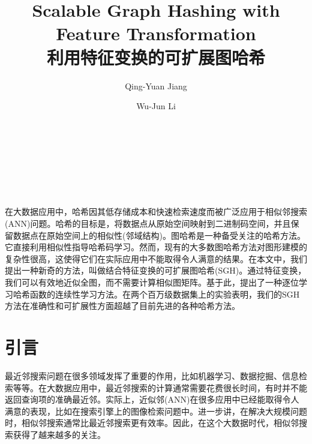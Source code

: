 \message{ !name(SGH.tex)}\documentclass[prodmode,acmtecs]{acmsmall}
\begin{document}


  
\title{Scalable Graph Hashing with Feature Transformation \\ 
	利用特征变换的可扩展图哈希} 

\author{Qing-Yuan Jiang}
\author{Wu-Jun Li}

\address{National Key Laboratory for Novel Software Technology }\\
\address{Collaborative Innovation Center of Novel Software Technology and Industrialization}\\
\address{Department of Computer Science and Technology, Nanjing University, China }\\


\maketitle


\begin{摘要}
  
在大数据应用中，哈希因其低存储成本和快速检索速度而被广泛应用于相似邻搜索(ANN)问题。哈希的目标是，将数据点从原始空间映射到二进制码空间，并且保留数据点在原始空间上的相似性(邻域结构)。图哈希是一种备受关注的哈希方法。它直接利用相似性指导哈希码学习。然而，现有的大多数图哈希方法对图形建模的复杂性很高，这使得它们在实际应用中不能取得令人满意的结果。在本文中，我们提出一种新奇的方法，叫做结合特征变换的可扩展图哈希(SGH)。通过特征变换，我们可以有效地近似全图，而不需要计算相似图矩阵。基于此，提出了一种逐位学习哈希函数的连续性学习方法。在两个百万级数据集上的实验表明，我们的SGH方法在准确性和可扩展性方面超越了目前先进的各种哈希方法。

\end{摘要}



\section{引言}

最近邻搜索问题\cite{Andoni2010Nearest}在很多领域发挥了重要的作用，比如机器学习、数据挖掘、信息检索等等。在大数据应用中，最近邻搜索的计算通常需要花费很长时间，有时并不能返回查询项的准确最近邻。实际上，近似邻(ANN)\cite{Indyk:1998:ANN:276698.276876,4031381}在很多应用中已经能取得令人满意的表现，比如在搜索引擎上的图像检索问题中。进一步讲，在解决大规模问题时，相似邻搜索通常比最近邻搜索更有效率。因此，在这个大数据时代，相似邻搜索获得了越来越多的关注\cite{4031381}。
\end{document}
